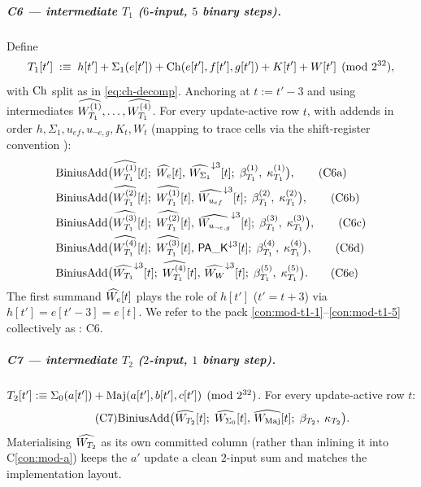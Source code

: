 \subparagraph{C6 — intermediate $T_1$ ($6$-input, $5$ binary steps).}
Define
\begin{equation}\label{eq:t1}
T_1[t'] \;:\equiv\; h[t'] + \Sigma_1(e[t']) + \operatorname{Ch}(e[t'],f[t'],g[t'])
+ K[t'] + W[t'] \pmod{2^{32}},
\end{equation}
with $\operatorname{Ch}$ split as in \eqref{eq:ch-decomp}. Anchoring at
$t := t' - 3$ and using intermediates $\widehat{W_{T_1}^{(1)}}, \dots,
\widehat{W_{T_1}^{(4)}}$. For every update-active row $t$, with addends in
order $h, \Sigma_1, u_{ef}, u_{\neg e,g}, K_t, W_t$ (mapping to
trace cells via the shift-register convention ):
\begin{align}
\mathrm{BiniusAdd}\bigl(
    &\widehat{W_{T_1}^{(1)}}[t];\;
    \widehat{W_e}[t],\,
    \widehat{W_{\Sigma_1}}^{\downarrow 3}[t];\;
    \beta_{T_1}^{(1)},\; \kappa_{T_1}^{(1)}\bigr), \tag{C6a}\label{con:mod-t1-1}\\
\mathrm{BiniusAdd}\bigl(
    &\widehat{W_{T_1}^{(2)}}[t];\;
    \widehat{W_{T_1}^{(1)}}[t],\,
    \widehat{W_{u_{ef}}}^{\downarrow 3}[t];\;
    \beta_{T_1}^{(2)},\; \kappa_{T_1}^{(2)}\bigr), \tag{C6b}\label{con:mod-t1-2}\\
\mathrm{BiniusAdd}\bigl(
    &\widehat{W_{T_1}^{(3)}}[t];\;
    \widehat{W_{T_1}^{(2)}}[t],\,
    \widehat{W_{u_{\neg e,g}}}^{\downarrow 3}[t];\;
    \beta_{T_1}^{(3)},\; \kappa_{T_1}^{(3)}\bigr), \tag{C6c}\label{con:mod-t1-3}\\
\mathrm{BiniusAdd}\bigl(
    &\widehat{W_{T_1}^{(4)}}[t];\;
    \widehat{W_{T_1}^{(3)}}[t],\,
    \mathsf{PA\_K}^{\downarrow 3}[t];\;
    \beta_{T_1}^{(4)},\; \kappa_{T_1}^{(4)}\bigr), \tag{C6d}\label{con:mod-t1-4}\\
\mathrm{BiniusAdd}\bigl(
    &\widehat{W_{T_1}}^{\downarrow 3}[t];\;
    \widehat{W_{T_1}^{(4)}}[t],\,
    \widehat{W_W}^{\downarrow 3}[t];\;
    \beta_{T_1}^{(5)},\; \kappa_{T_1}^{(5)}\bigr). \tag{C6e}\label{con:mod-t1-5}
\end{align}
The first summand $\widehat{W_e}[t]$ plays the role of $h[t']$
($t' = t + 3$) via $h[t'] = e[t'-3] = e[t]$. We refer to the pack
\eqref{con:mod-t1-1}--\eqref{con:mod-t1-5} collectively as
: \label{con:mod-t1}\(\text{C6}\).

\subparagraph{C7 — intermediate $T_2$ ($2$-input, $1$ binary step).}
$T_2[t'] :\equiv \Sigma_0(a[t']) + \operatorname{Maj}(a[t'], b[t'], c[t']) \pmod{2^{32}}$.
For every update-active row $t$:
\begin{equation}\tag{C7}\label{con:mod-t2}
\mathrm{BiniusAdd}\bigl(
    \widehat{W_{T_2}}[t];\;
    \widehat{W_{\Sigma_0}}[t],\, \widehat{W_{\operatorname{Maj}}}[t];\;
    \beta_{T_2},\; \kappa_{T_2}\bigr).
\end{equation}
Materialising $\widehat{W_{T_2}}$ as its own committed column (rather than
inlining it into C\ref{con:mod-a}) keeps the $a'$ update a clean
$2$-input sum and matches the implementation layout.

